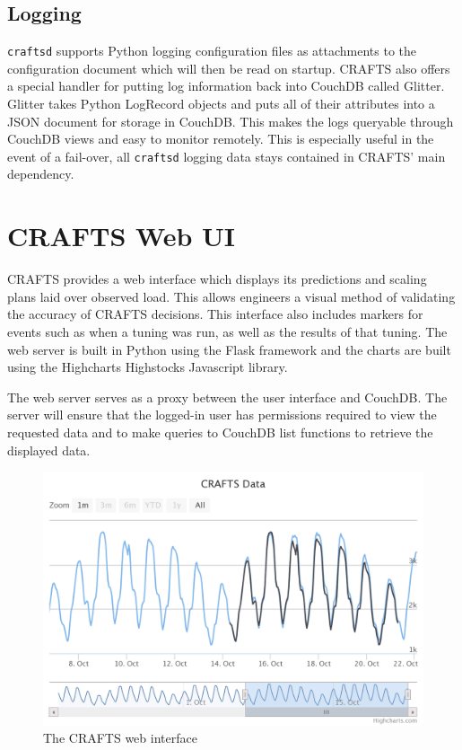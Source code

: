 \subsection{Logging}
\texttt{craftsd} supports Python logging configuration files as attachments to the configuration document which will then be read on startup. CRAFTS also offers a special handler for putting log information back into CouchDB called Glitter. Glitter takes Python LogRecord objects and puts all of their attributes into a JSON document for storage in CouchDB. This makes the logs queryable through CouchDB views and easy to monitor remotely. This is especially useful in the event of a fail-over, all \texttt{craftsd} logging data stays contained in CRAFTS' main dependency.

\section{CRAFTS Web UI}
CRAFTS provides a web interface which displays its predictions and scaling plans laid over observed load. This allows engineers a visual method of validating the accuracy of CRAFTS decisions. This interface also includes markers for events such as when a tuning was run, as well as the results of that tuning. The web server is built in Python using the Flask framework and the charts are built using the Highcharts Highstocks Javascript library.

The web server serves as a proxy between the user interface and CouchDB. The server will ensure that the logged-in user has permissions required to view the requested data and to make queries to CouchDB list functions to retrieve the displayed data.

\begin{figure}
\centering
\includegraphics[width=\textwidth]{diagrams/webui.png}
\caption{The CRAFTS web interface}
\label{fig:webui}
\end{figure}